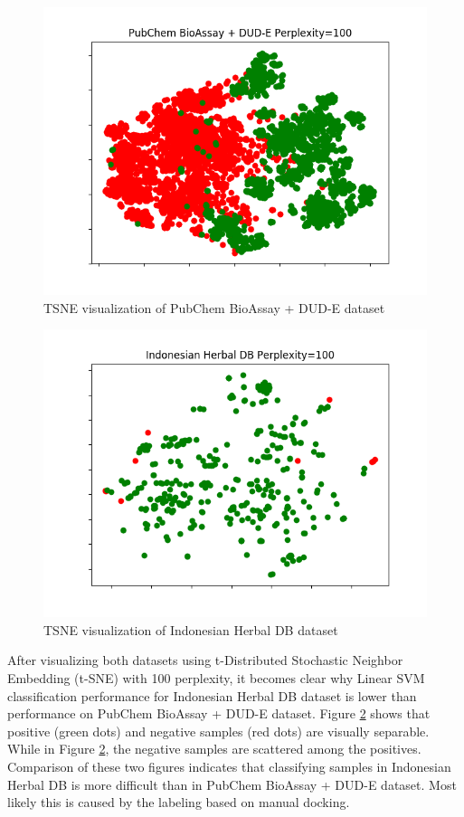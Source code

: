 \documentclass[conference,compsoc,12pt]{IEEEtran}
\begin{document}
	\begin{figure}
		\includegraphics[scale=0.5]{../images/visualize-dataset_tsne_pubchem_100.png}
		\caption{TSNE visualization of PubChem BioAssay + DUD-E dataset}
		\label{fig_tsne_pubchem}
	\end{figure}
	
	\begin{figure}
		\includegraphics[scale=0.5]{../images/visualize-dataset_tsne_herbaldb_expanded_100.png}
		\caption{TSNE visualization of Indonesian Herbal DB dataset}
		\label{fig_tsne_herbaldb}
	\end{figure}	

	After visualizing both datasets using t-Distributed Stochastic Neighbor Embedding (t-SNE) \cite{maaten2008visualizing} with 100 perplexity, it becomes clear why Linear SVM classification performance for Indonesian Herbal DB dataset is lower than performance on PubChem BioAssay + DUD-E dataset. Figure \ref{fig_tsne_herbaldb} shows that positive (green dots) and negative samples (red dots) are visually separable. While in Figure \ref{fig_tsne_herbaldb}, the negative samples are scattered among the positives. Comparison of these two figures indicates that classifying samples in Indonesian Herbal DB is more difficult than in PubChem BioAssay + DUD-E dataset. Most likely this is caused by the labeling based on manual docking.
	
\end{document}
